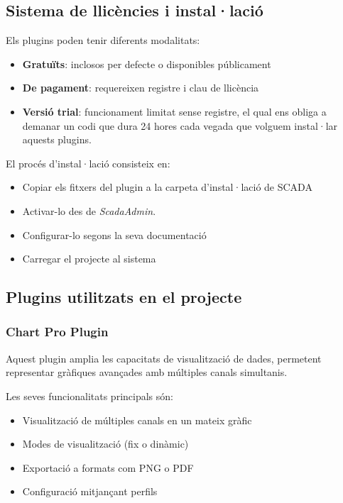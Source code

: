 \documentclass[12pt,a4paper]{report}
\begin{document}
\subsection{Sistema de llicències i instal·lació}

Els plugins poden tenir diferents modalitats:
\begin{itemize}
    \item \textbf{Gratuïts}: inclosos per defecte o disponibles públicament
    \item \textbf{De pagament}: requereixen registre i clau de llicència
    \item \textbf{Versió trial}: funcionament limitat sense registre, el qual ens obliga a demanar un codi que dura 24 hores cada vegada que volguem instal·lar aquests plugins. 
\end{itemize}

El procés d'instal·lació consisteix en:
\begin{itemize}
    \item Copiar els fitxers del plugin a la carpeta d'instal·lació de SCADA
    \item Activar-lo des de \textit{ScadaAdmin}.
    \item Configurar-lo segons la seva documentació
    \item Carregar el projecte al sistema
\end{itemize}


\subsection{Plugins utilitzats en el projecte}

\subsubsection{Chart Pro Plugin}

Aquest plugin \cite{rapidscada_chart_pro} amplia les capacitats de visualització de dades, permetent representar gràfiques avançades amb múltiples canals simultanis.

Les seves funcionalitats principals són:
\begin{itemize}
    \item Visualització de múltiples canals en un mateix gràfic
    \item Modes de visualització (fix o dinàmic)
    \item Exportació a formats com PNG o PDF
    \item Configuració mitjançant perfils
\end{itemize}
\end{document}
